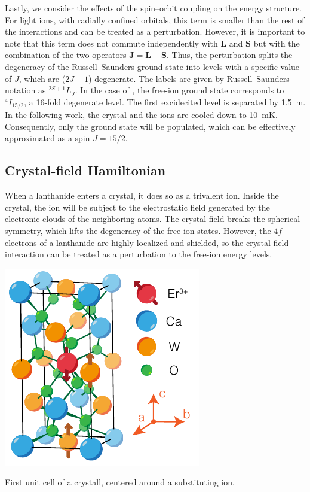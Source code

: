 Lastly, we consider the effects of the spin--orbit coupling on the energy structure. For light ions, with radially confined orbitals, this term is smaller than the rest of the interactions and can be treated as a perturbation. However, it is important to note that this term does not commute independently with $\mathbf{L}$ and $\mathbf{S}$ but with the combination of the two operators $\mathbf{J} = \mathbf{L} + \mathbf{S}$. Thus, the perturbation splits the degeneracy of the Russell--Saunders ground state into levels with a specific value of $J$, which are ($2J+1$)-degenerate. The labels are given by Russell--Saunders notation as $^{2S+1}L_J$. In the case of \Er, the free-ion ground state corresponds to $^4I_{15/2}$, a 16-fold degenerate level. The first excidecited level is separated by 1.5~\textmu m. In the following work, the \Ca crystal and the ions are cooled down to 10~mK. Consequently, only the ground state will be populated, which can be effectively approximated as a spin $J=15/2$.

\subsection{Crystal-field Hamiltonian}
When a lanthanide enters a crystal, it does so as a trivalent ion. Inside the crystal, the ion will be subject to the electrostatic field generated by the electronic clouds of the neighboring atoms. The crystal field breaks the spherical symmetry, which lifts the degeneracy of the free-ion states. However, the $4f$ electrons of a lanthanide are highly localized and shielded, so the crystal-field interaction can be treated as a perturbation to the free-ion energy levels. 

\begin{marginfigure}
    \includegraphics{chapter2/figures/crystal.pdf}
    \caption[\Ca crystal]{First unit cell of a \Ca crystall, centered around a substituting \Er ion.}
\end{marginfigure}

